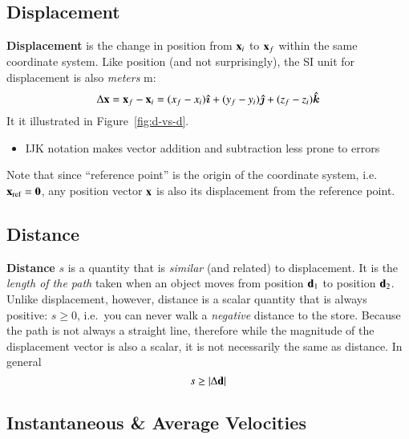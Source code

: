 \documentclass[11pt]{article}
\newcommand{\mb}[1]{\ensuremath\mathbf{#1}}
\begin{document}
\subsection{Displacement}

\textbf{Displacement} is the change in position from $\mb{x}_i$ to
$\mb{x}_f$ within the
same coordinate system. Like position (and not surprisingly), the SI unit for
displacement is also \emph{meters} \si{\metre}:
\begin{equation*}
  \Delta\mb{x}=\mb{x}_f-\mb{x}_i
  =(x_f-x_i)\bm{\hat{\imath}}+
  (y_f-y_i)\bm{\hat{\jmath}}+
  (z_f-z_i)\bm{\hat{k}}
\end{equation*}
It it illustrated in Figure~\ref{fig:d-vs-d}.
\begin{itemize}
\item IJK notation makes vector addition and subtraction less prone to errors
\end{itemize}
Note that since ``reference point'' is the origin of the coordinate system,
i.e.\ $\mb{x}_{\textrm{ref}}=\mb{0}$, any position vector $\mb{x}$ is also its
displacement from the reference point.



\subsection{Distance}%

\textbf{Distance} $s$ is a quantity that is \emph{similar} (and related) to
displacement. It is the \emph{length of the path} taken when an object moves
from position $\mb{d}_1$ to position $\mb{d}_2$. Unlike displacement, however,
distance is a scalar quantity that is always positive: $s\geq 0$, i.e.\ you can
never walk a \emph{negative} distance to the store.
Because the path is not always a straight line,
therefore while the magnitude of the displacement vector is also a scalar,
it is not necessarily the same as distance. In general
\begin{equation*}
  s\geq |\Delta\mb{d}|
\end{equation*}


\subsection{Instantaneous \& Average Velocities}
\end{document}
